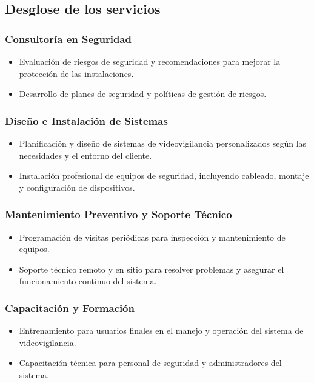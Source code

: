 \documentclass{report}
\begin{document}
          \subsection{Desglose de los servicios}
            \subsubsection*{Consultoría en Seguridad}
              \begin{itemize}
                \item Evaluación de riesgos de seguridad y recomendaciones para mejorar la protección de las instalaciones.
                \item Desarrollo de planes de seguridad y políticas de gestión de riesgos.
              \end{itemize}
            \subsubsection*{Diseño e Instalación de Sistemas}
              \begin{itemize}
                \item Planificación y diseño de sistemas de videovigilancia personalizados según las necesidades y el entorno del cliente.
                \item Instalación profesional de equipos de seguridad, incluyendo cableado, montaje y configuración de dispositivos.
              \end{itemize}
            \subsubsection*{Mantenimiento Preventivo y Soporte Técnico}
              \begin{itemize}
                \item Programación de visitas periódicas para inspección y mantenimiento de equipos.
                \item Soporte técnico remoto y en sitio para resolver problemas y asegurar el funcionamiento continuo del sistema.
              \end{itemize}
            \subsubsection*{Capacitación y Formación}
              \begin{itemize}
                \item Entrenamiento para usuarios finales en el manejo y operación del sistema de videovigilancia.
                \item Capacitación técnica para personal de seguridad y administradores del sistema.
              \end{itemize}
\end{document}
